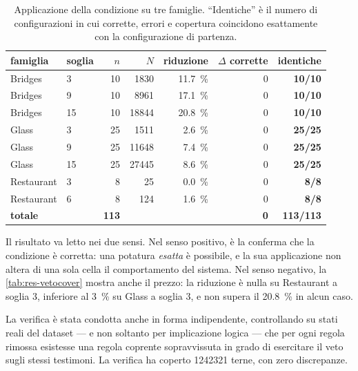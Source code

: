 \begin{table}[htbp]
\centering
\caption{Applicazione della condizione \Vtwo{} su tre famiglie. ``Identiche'' è il numero di
configurazioni in cui corrette, errori e copertura coincidono esattamente con la configurazione
di partenza.}
\label{tab:res-vetocover}
\footnotesize
\begin{tabular}{llrrrrr}
\toprule
famiglia & soglia & $n$ & $N$ & riduzione & $\Delta$ corrette & identiche \\
\midrule
Bridges    & 3  & 10 & \num{1830}  & \SI{11.7}{\percent} & 0 & \textbf{10/10} \\
Bridges    & 9  & 10 & \num{8961}  & \SI{17.1}{\percent} & 0 & \textbf{10/10} \\
Bridges    & 15 & 10 & \num{18844} & \SI{20.8}{\percent} & 0 & \textbf{10/10} \\
Glass      & 3  & 25 & \num{1511}  & \SI{2.6}{\percent}  & 0 & \textbf{25/25} \\
Glass      & 9  & 25 & \num{11648} & \SI{7.4}{\percent}  & 0 & \textbf{25/25} \\
Glass      & 15 & 25 & \num{27445} & \SI{8.6}{\percent}  & 0 & \textbf{25/25} \\
Restaurant & 3  &  8 & 25          & \SI{0.0}{\percent}  & 0 & \textbf{8/8} \\
Restaurant & 6  &  8 & 124         & \SI{1.6}{\percent}  & 0 & \textbf{8/8} \\
\midrule
\textbf{totale} & & \textbf{113} & & & \textbf{0} & \textbf{113/113} \\
\bottomrule
\end{tabular}
\end{table}

Il risultato va letto nei due sensi. Nel senso positivo, è la conferma che la condizione \Vtwo{}
è corretta: una potatura \emph{esatta} è possibile, e la sua applicazione non altera di una sola
cella il comportamento del sistema. Nel senso negativo, la \autoref{tab:res-vetocover} mostra
anche il prezzo: la riduzione è nulla su Restaurant a soglia 3, inferiore al \SI{3}{\percent} su
Glass a soglia 3, e non supera il \SI{20.8}{\percent} in alcun caso.

La verifica è stata condotta anche in forma indipendente, controllando su stati reali del dataset
--- e non soltanto per implicazione logica --- che per ogni regola rimossa esistesse una regola
coprente sopravvissuta in grado di esercitare il veto sugli stessi testimoni. La verifica ha
coperto \num{1242321} terne, con zero discrepanze.

